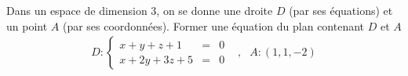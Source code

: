 Dans un espace de dimension 3, on se donne une droite $D$ (par ses \'equations) et un point $A$ (par ses coordonn\'ees). Former une \'equation du plan contenant $D$ et $A$
\begin{align*}
 D : \left\lbrace \begin{array}{ccc}
x+y+z+1 &=& 0\\
x+2y+3z +5 &=& 0
\end{array}\right. 
 &,& A :(1,1,-2)
\end{align*}
\bigskip
